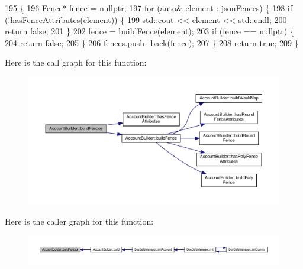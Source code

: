 \begin{DoxyCode}
195 \{
196     \hyperlink{class_fence}{Fence}* fence = \textcolor{keyword}{nullptr};
197     \textcolor{keywordflow}{for} (\textcolor{keyword}{auto}& element : jsonFences) \{
198         \textcolor{keywordflow}{if} (!\hyperlink{class_account_builder_a6d19e707adebbf868e26d66f9028a47d}{hasFenceAttributes}(element)) \{
199             std::cout << element << std::endl;
200             \textcolor{keywordflow}{return} \textcolor{keyword}{false};
201         \}
202         fence = \hyperlink{class_account_builder_ac5801a1130d7a1f84a66c45cfd6e0a8d}{buildFence}(element);
203         \textcolor{keywordflow}{if} (fence == \textcolor{keyword}{nullptr}) \{
204             \textcolor{keywordflow}{return} \textcolor{keyword}{false};
205         \}
206         fences.push\_back(fence);
207     \}
208     \textcolor{keywordflow}{return} \textcolor{keyword}{true};
209 \}
\end{DoxyCode}
Here is the call graph for this function\+:\nopagebreak
\begin{figure}[H]
\begin{center}
\leavevmode
\includegraphics[width=350pt]{d9/daa/class_account_builder_a1992add0c2ab404664d4cbae326c6ec7_cgraph}
\end{center}
\end{figure}
Here is the caller graph for this function\+:\nopagebreak
\begin{figure}[H]
\begin{center}
\leavevmode
\includegraphics[width=350pt]{d9/daa/class_account_builder_a1992add0c2ab404664d4cbae326c6ec7_icgraph}
\end{center}
\end{figure}
\mbox{\label{class_account_builder_a9a93946d8ba8908f6bcfa6b793cc6277}} 
